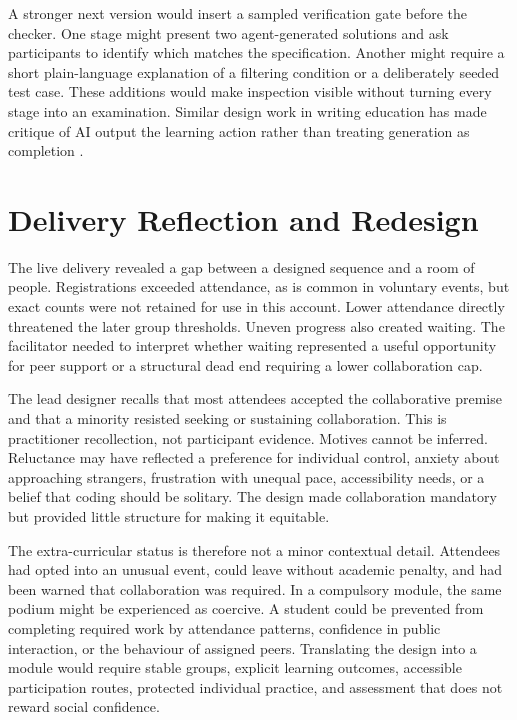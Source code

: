 \documentclass[11pt,a4paper]{article}
\begin{document}
A stronger next version would insert a sampled verification gate before the checker. One stage might present two agent-generated solutions and ask participants to identify which matches the specification. Another might require a short plain-language explanation of a filtering condition or a deliberately seeded test case. These additions would make inspection visible without turning every stage into an examination. Similar design work in writing education has made critique of AI output the learning action rather than treating generation as completion \citep{brinkman2025writing}.

\section{Delivery Reflection and Redesign}

The live delivery revealed a gap between a designed sequence and a room of people. Registrations exceeded attendance, as is common in voluntary events, but exact counts were not retained for use in this account. Lower attendance directly threatened the later group thresholds. Uneven progress also created waiting. The facilitator needed to interpret whether waiting represented a useful opportunity for peer support or a structural dead end requiring a lower collaboration cap.

The lead designer recalls that most attendees accepted the collaborative premise and that a minority resisted seeking or sustaining collaboration. This is practitioner recollection, not participant evidence. Motives cannot be inferred. Reluctance may have reflected a preference for individual control, anxiety about approaching strangers, frustration with unequal pace, accessibility needs, or a belief that coding should be solitary. The design made collaboration mandatory but provided little structure for making it equitable.

The extra-curricular status is therefore not a minor contextual detail. Attendees had opted into an unusual event, could leave without academic penalty, and had been warned that collaboration was required. In a compulsory module, the same podium might be experienced as coercive. A student could be prevented from completing required work by attendance patterns, confidence in public interaction, or the behaviour of assigned peers. Translating the design into a module would require stable groups, explicit learning outcomes, accessible participation routes, protected individual practice, and assessment that does not reward social confidence.
\end{document}
